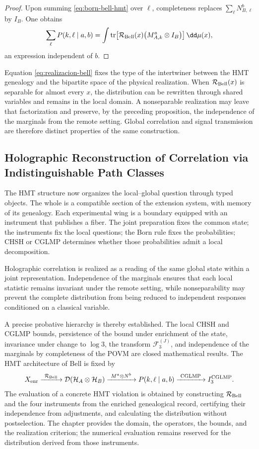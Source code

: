 \begin{proof}
Upon summing \eqref{eq:born-bell-hmt} over \(\ell\), completeness replaces
\(\sum_\ell N_{B,\ell}^{b}\) by \(I_B\). One obtains
\[
 \sum_{\ell}P(k,\ell\mid a,b)
 =\int\operatorname{tr}\!\left[
   \mathcal R_{\rm Bell}(x)
   \bigl(M_{A,k}^{a}\otimes I_B\bigr)
  \right]\dd\mu(x),
\]
an expression independent of \(b\).
\end{proof}

Equation \eqref{eq:realizacion-bell} fixes the type of the intertwiner between the
HMT genealogy and the bipartite space of the physical realization. When
\(\mathcal R_{\rm Bell}(x)\) is separable for almost every \(x\), the distribution
can be rewritten through shared variables and remains in the local domain.
A nonseparable realization may leave that factorization and preserve, by the
preceding proposition, the independence of the marginals from the remote setting.
Global correlation and signal transmission are therefore distinct properties of the
same construction.

\subsection{Holographic Reconstruction of Correlation via Indistinguishable Path Classes}

The HMT structure now organizes the local--global question through typed objects.
The whole is a compatible section of the extension system,
with memory of its genealogy. Each experimental wing is a boundary
equipped with an instrument that publishes a fiber. The joint preparation fixes the
common state; the instruments fix the local questions; the Born rule fixes
the probabilities; CHSH or CGLMP determines whether those probabilities admit a
local decomposition.

Holographic correlation is realized as a reading of the same global state within
a joint representation. Independence of the marginals ensures that each
local statistic remains invariant under the remote setting, while
nonseparability may
prevent the complete distribution from being reduced to independent responses
conditioned on a classical variable.

A precise probative hierarchy is thereby established. The local CHSH and CGLMP bounds, persistence of the bound under enrichment of the state, invariance under change to \(\log 3\), the transform \(\mathcal F_3^{(J)}\), and independence of the marginals by completeness of the POVM are closed mathematical results. The HMT architecture of Bell is fixed by
\[
 X_{\rm enr}
 \xrightarrow{\ \mathcal R_{\rm Bell}\ }
 \mathcal D(\mathcal H_A\otimes\mathcal H_B)
 \xrightarrow{\ M^a\otimes N^b\ }
 P(k,\ell\mid a,b)
 \xrightarrow{\ \mathrm{CGLMP}\ }
 I_3^{\rm CGLMP}.
\]
The evaluation of a concrete HMT violation is obtained by constructing
\(\mathcal R_{\rm Bell}\) and the four instruments from the enriched genealogical record,
certifying their independence from adjustments, and calculating the distribution without
postselection. The chapter provides the domain, the operators, the bounds, and the
realization criterion; the numerical evaluation remains reserved for the distribution
derived from those instruments.
